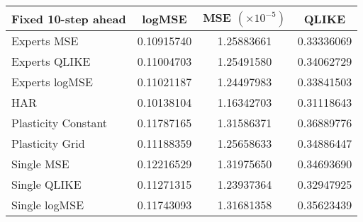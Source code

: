 
\begin{tabular}{l|c|c|c}
Fixed 10-step ahead     & logMSE & MSE $(\times 10^{-5})$ & QLIKE \\\hline
Experts MSE & 0.10915740 & 1.25883661 & 0.33336069\\ 
Experts QLIKE & 0.11004703 & 1.25491580 & 0.34062729\\ 
Experts logMSE & 0.11021187 & 1.24497983 & 0.33841503\\ 
HAR & 0.10138104 & 1.16342703 & 0.31118643\\ 
Plasticity Constant & 0.11787165 & 1.31586371 & 0.36889776\\ 
Plasticity Grid & 0.11188359 & 1.25658633 & 0.34886447\\ 
Single MSE & 0.12216529 & 1.31975650 & 0.34693690\\ 
Single QLIKE & 0.11271315 & 1.23937364 & 0.32947925\\ 
Single logMSE & 0.11743093 & 1.31681358 & 0.35623439\\ 
\end{tabular}